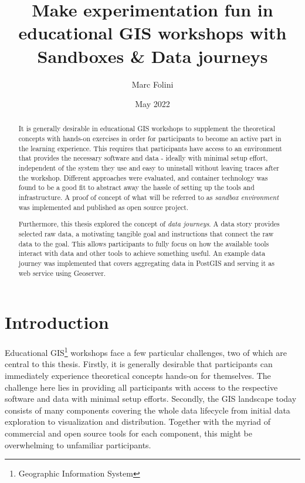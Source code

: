 \documentclass[11pt, a4paper, oneside, parskip=full-]{scrartcl}
\title{Make experimentation fun in educational GIS workshops with Sandboxes \& Data journeys}
\author{Marc Folini}
\date{May 2022}
\begin{document}
\begin{titlepage}
  \setcounter{page}{1}
  \clearpage\maketitle
  \thispagestyle{empty}
  \begin{abstract}
    It is generally desirable in educational GIS workshops to supplement the
    theoretical concepts with hands-on exercises in order for participants to
    become an active part in the learning experience. This requires that
    participants have access to an environment that provides the necessary
    software and data - ideally with minimal setup effort, independent of the
    system they use and easy to uninstall without leaving traces after the
    workshop. Different approaches were evaluated, and container technology was
    found to be a good fit to abstract away the hassle of setting up the tools
    and infrastructure. A proof of concept of what will be referred to as
    \emph{sandbox environment} was implemented and published as open source
    project.

    Furthermore, this thesis explored the concept of \emph{data journeys}. A
    data story provides selected raw data, a motivating tangible goal and
    instructions that connect the raw data to the goal. This allows participants
    to fully focus on how the available tools interact with data and other tools
    to achieve something useful. An example data journey was implemented that
    covers aggregating data in PostGIS and serving it as web service using
    Geoserver.
  \end{abstract}
\end{titlepage}

\newpage
\tableofcontents

\newpage
{}
\setcounter{page}{1}
\section{Introduction}
Educational GIS\footnote{Geographic Information System} workshops face a few
particular challenges, two of which are central to this thesis. Firstly, it is
generally desirable that participants can immediately experience theoretical
concepts hands-on for themselves. The challenge here lies in providing all
participants with access to the respective software and data with minimal setup
efforts. Secondly, the GIS landscape today consists of many components covering
the whole data lifecycle from initial data exploration to visualization and
distribution. Together with the myriad of commercial and open source tools for
each component, this might be overwhelming to unfamiliar participants.
\end{document}
